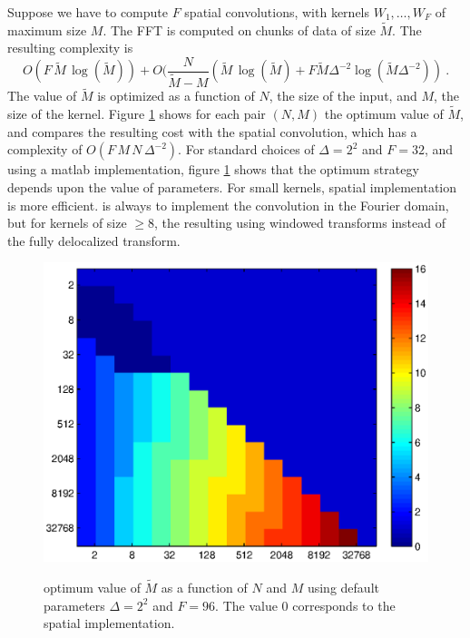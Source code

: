 \documentclass{article}
\begin{document}
Suppose we have to compute $F$ spatial convolutions, 
with kernels $W_1,\dots,W_F$ of maximum size $M$.
The FFT is computed on chunks of data 
of size $\tilde{M}$.
 The resulting complexity is 
$$O(F\, \tilde{M}\, \log(\tilde{M})) + O( \frac{N}{\tilde{M} - M} ( \tilde{M}\, \log(\tilde{M}) + F \tilde{M} \Delta^{-2} \log(\tilde{M} \Delta^{-2}) )~.$$
The value of $\tilde{M}$ is optimized as a function of $N$, the size of the input, 
and $M$, the size of the kernel. Figure \ref{fftfig} shows for each pair $(N,M)$ the 
optimum value of $\tilde{M}$, and compares the resulting cost 
with the spatial convolution, which has a complexity of $O(F \, M \, N\, \Delta^{-2})$.
 For standard choices of $\Delta=2^2$ and $F=32$, 
and using a matlab implementation, figure \ref{fftfig} 
shows that the optimum 
strategy depends upon the value of parameters. For small kernels, 
spatial implementation is more efficient. 
is always to implement the convolution in the Fourier domain, but
for kernels of size $\geq 8$, the resulting 
using windowed transforms instead of the fully delocalized transform.


\begin{figure}[h]
\caption{optimum value of $\tilde{M}$ as a function of $N$ and $M$ 
using default parameters $\Delta=2^2$ and $F=96$. The value $0$ 
corresponds to the spatial implementation.} 
\includegraphics[scale=0.6]{img/fftconvanalysis1.eps}
\label{fftfig}
\end{figure}
\end{document}
